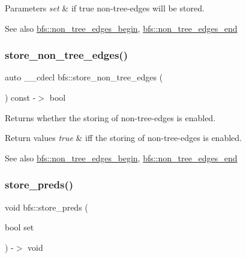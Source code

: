 \begin{DoxyParams}{Parameters}
{\em set} & if true non-\/tree-\/edges will be stored. \\
\hline
\end{DoxyParams}
\begin{DoxySeeAlso}{See also}
\mbox{\hyperlink{classbfs_a15d846159cfe9524081ad318fb72661f}{bfs\+::non\+\_\+tree\+\_\+edges\+\_\+begin}}, \mbox{\hyperlink{classbfs_ae4d59095371f625a831de4262ab16d31}{bfs\+::non\+\_\+tree\+\_\+edges\+\_\+end}} 
\end{DoxySeeAlso}
\mbox{\label{classbfs_a9c0188bc1f5a26aa48201640adcaa078}} 
\subsubsection{\texorpdfstring{store\+\_\+non\+\_\+tree\+\_\+edges()}{store\_non\_tree\_edges()}\hspace{0.1cm}{\footnotesize\ttfamily [2/2]}}
{\footnotesize\ttfamily auto \+\_\+\+\_\+cdecl bfs\+::store\+\_\+non\+\_\+tree\+\_\+edges (\begin{DoxyParamCaption}{ }\end{DoxyParamCaption}) const -\/$>$ bool \hspace{0.3cm}{\ttfamily [inline]}}



Returns whether the storing of non-\/tree-\/edges is enabled. 


\begin{DoxyRetVals}{Return values}
{\em true} & iff the storing of non-\/tree-\/edges is enabled. \\
\hline
\end{DoxyRetVals}
\begin{DoxySeeAlso}{See also}
\mbox{\hyperlink{classbfs_a15d846159cfe9524081ad318fb72661f}{bfs\+::non\+\_\+tree\+\_\+edges\+\_\+begin}}, \mbox{\hyperlink{classbfs_ae4d59095371f625a831de4262ab16d31}{bfs\+::non\+\_\+tree\+\_\+edges\+\_\+end}} 
\end{DoxySeeAlso}
\mbox{\label{classbfs_aa7200a3b11a17b8c87675b1a9bc010aa}} 
\subsubsection{\texorpdfstring{store\+\_\+preds()}{store\_preds()}\hspace{0.1cm}{\footnotesize\ttfamily [1/2]}}
{\footnotesize\ttfamily void bfs\+::store\+\_\+preds (\begin{DoxyParamCaption}\item[{bool}]{set }\end{DoxyParamCaption}) -\/$>$ void}



